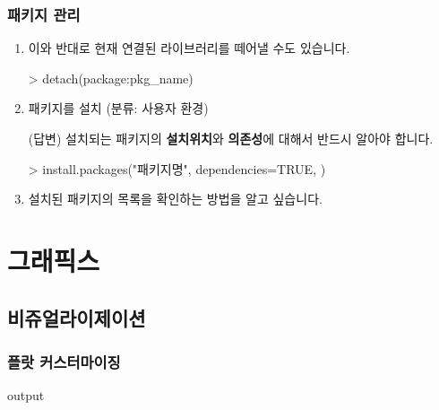 \documentclass{book}
\begin{document}
\section{패키지 관리}
\begin{enumerate}
\item 	이와 반대로 현재 연결된 라이브러리를 떼어낼 수도 있습니다. 

	\begin{Schunk}
	\begin{Soutput}
	> detach(package:pkg_name)	
	\end{Soutput}
	\end{Schunk}


	\item 패키지를 설치 (분류: 사용자 환경)  
	
	\textsf{(답변)} 설치되는 패키지의 \textbf{설치위치}와 \textbf{의존성}에 대해서 반드시 알아야 합니다. 
	
	\begin{Schunk}
	\begin{Soutput}
	> install.packages("패키지명", dependencies=TRUE, )
	\end{Soutput}
	\end{Schunk}

	\item 설치된 패키지의 목록을 확인하는 방법을 알고 싶습니다.
\end{enumerate}


%
%

\part{그래픽스}
\chapter{비쥬얼라이제이션}

\section{플랏 커스터마이징}
\begin{Schunk}
\begin{Soutput}
output
\end{Soutput}
\end{Schunk}
\end{document}
